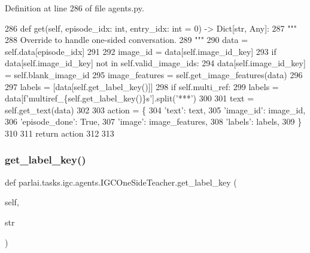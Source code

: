 Definition at line 286 of file agents.\+py.


\begin{DoxyCode}
286     \textcolor{keyword}{def }get(self, episode\_idx: int, entry\_idx: int = 0) -> Dict[str, Any]:
287         \textcolor{stringliteral}{"""}
288 \textcolor{stringliteral}{        Override to handle one-sided conversation.}
289 \textcolor{stringliteral}{        """}
290         data = self.data[episode\_idx]
291 
292         image\_id = data[self.image\_id\_key]
293         \textcolor{keywordflow}{if} data[self.image\_id\_key] \textcolor{keywordflow}{not} \textcolor{keywordflow}{in} self.valid\_image\_ids:
294             data[self.image\_id\_key] = self.blank\_image\_id
295         image\_features = self.get\_image\_features(data)
296 
297         labels = [data[self.get\_label\_key()]]
298         \textcolor{keywordflow}{if} self.multi\_ref:
299             labels = data[f\textcolor{stringliteral}{'multiref\_\{self.get\_label\_key()\}s'}].split(\textcolor{stringliteral}{'***'})
300 
301         text = self.get\_text(data)
302 
303         action = \{
304             \textcolor{stringliteral}{'text'}: text,
305             \textcolor{stringliteral}{'image\_id'}: image\_id,
306             \textcolor{stringliteral}{'episode\_done'}: \textcolor{keyword}{True},
307             \textcolor{stringliteral}{'image'}: image\_features,
308             \textcolor{stringliteral}{'labels'}: labels,
309         \}
310 
311         \textcolor{keywordflow}{return} action
312 
313 
\end{DoxyCode}
\mbox{\label{classparlai_1_1tasks_1_1igc_1_1agents_1_1IGCOneSideTeacher_aa2f9cd182fb837af0babaf21c64b0617}} 
\subsubsection{\texorpdfstring{get\+\_\+label\+\_\+key()}{get\_label\_key()}}
{\footnotesize\ttfamily def parlai.\+tasks.\+igc.\+agents.\+I\+G\+C\+One\+Side\+Teacher.\+get\+\_\+label\+\_\+key (\begin{DoxyParamCaption}\item[{}]{self,  }\item[{}]{str }\end{DoxyParamCaption})}

